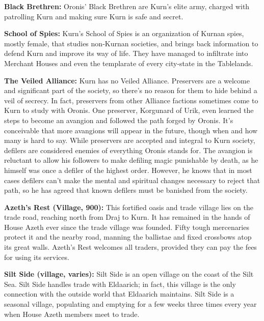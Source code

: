 {
	\textbf{Black Brethren:} Oronis’ Black Brethren are Kurn’s elite army, charged with patrolling Kurn and making sure Kurn is safe and secret.

	\textbf{School of Spies:} Kurn’s School of Spies is an organization of Kurnan spies, mostly female, that studies non‐Kurnan societies, and brings back information to defend Kurn and improve its way of life. They have managed to infiltrate into Merchant Houses and even the templarate of every city‐state in the Tablelands.

	\textbf{The Veiled Alliance:} Kurn has no Veiled Alliance. Preservers are a welcome and significant part of the society, so there’s no reason for them to hide behind a veil of secrecy. In fact, preservers from other Alliance factions sometimes come to Kurn to study with Oronis. One preserver, Korgunard of Urik, even learned the steps to become an avangion and followed the path forged by Oronis. It’s conceivable that more avangions will appear in the future, though when and how many is hard to say. While preservers are accepted and integral to Kurn society, defilers are considered enemies of everything Oronis stands for. The avangion is reluctant to allow his followers to make defiling magic punishable by death, as he himself was once a defiler of the highest order. However, he knows that in most cases defilers can’t make the mental and spiritual changes necessary to reject that path, so he has agreed that known defilers must be banished from the society.
}
{
	\textbf{Azeth’s Rest (Village, 900):} This fortified oasis and trade village lies on the trade road, reaching north from Draj to Kurn. It has remained in the hands of House Azeth ever since the trade village was founded. Fifty tough mercenaries protect it and the nearby road, manning the ballistae and fixed crossbows atop its great walls. Azeth’s Rest welcomes all traders, provided they can pay the fees for using its services.

	\textbf{Silt Side (village, varies):} Silt Side is an open village on the coast of the Silt Sea. Silt Side handles trade with Eldaarich; in fact, this village is the only connection with the outside world that Eldaarich maintains. Silt Side is a seasonal village, populating and emptying for a few weeks three times every year when House Azeth members meet to trade.
}
{}
